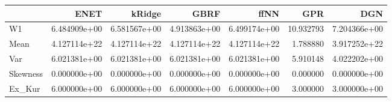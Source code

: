 \begin{tabular}{lrrrrrr}
\toprule
{} &          ENET &        kRidge &          GBRF &          ffNN &        GPR &           DGN \\
\midrule
W1       &  6.484909e+00 &  6.581567e+00 &  4.913863e+00 &  6.499174e+00 &  10.932793 &  7.204366e+00 \\
Mean     &  4.127114e+22 &  4.127114e+22 &  4.127114e+22 &  4.127114e+22 &   1.788880 &  3.917252e+22 \\
Var      &  6.021381e+00 &  6.021381e+00 &  6.021381e+00 &  6.021381e+00 &   5.910148 &  4.022202e+00 \\
Skewness &  0.000000e+00 &  0.000000e+00 &  0.000000e+00 &  0.000000e+00 &   0.000000 &  0.000000e+00 \\
Ex\_Kur   &  6.000000e+00 &  6.000000e+00 &  6.000000e+00 &  6.000000e+00 &   3.000000 &  3.000000e+00 \\
\bottomrule
\end{tabular}
